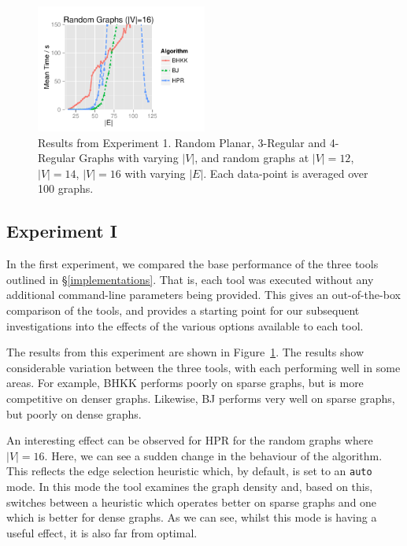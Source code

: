 \begin{figure}[!p]
\includegraphics[width=0.5\textwidth]{data/Exp1_random16_graphs.pdf}
\caption{Results from Experiment 1.  Random Planar, 3-Regular and 4-Regular Graphs with varying $|V|$, and random graphs at $|V|= 12$, $|V|= 14$, $|V|= 16$ with varying $|E|$.  Each data-point is averaged over 100 graphs.}
\label{experiment_1}
\end{figure}

\subsection{Experiment I}

In the first experiment, we compared the base performance of the three tools outlined in \S\ref{implementations}.  That is, each tool was executed without any additional command-line parameters being provided.  This gives an out-of-the-box comparison of the tools, and provides a starting point for our subsequent investigations into the effects of the various options available to each tool.

The results from this experiment are shown in Figure~\ref{experiment_1}.  The results show considerable variation between the three tools, with each performing well in some areas.  For example, BHKK performs poorly on sparse graphs, but is more competitive on denser graphs.  Likewise, BJ performs very well on sparse graphs, but poorly on dense graphs. 

An interesting effect can be observed for HPR for the random graphs where $|V|=16$.  Here, we can see a sudden change in the behaviour of the algorithm.  This reflects the edge selection heuristic which, by default, is set to an \verb+auto+ mode.  In this mode the tool examines the graph density and, based on this, switches between a heuristic which operates better on sparse graphs and one which is better for dense graphs.  As we can see, whilst this mode is having a useful effect, it is also far from optimal.


